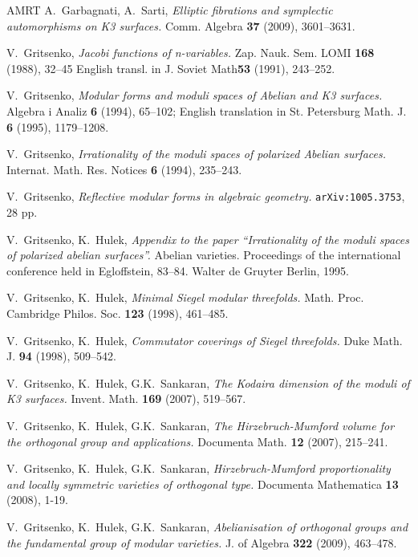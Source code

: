 \documentclass[a4paper,11pt]{article}
\begin{document}
\begin{thebibliography}{AMRT}
 A.~Garbagnati, A.~Sarti, {\it Elliptic fibrations and
  symplectic automorphisms on K3 surfaces.}  Comm. Algebra {\bf 37}
  (2009), 3601--3631.

 V.~Gritsenko, {\it Jacobi functions of n-variables.}
  Zap. Nauk. Sem. LOMI {\bf 168} (1988), 32--45 English transl. in
  J. Soviet Math\. {\bf 53} (1991), 243--252.

 V.~Gritsenko, {\it Modular forms and moduli spaces of
  Abelian and K3 surfaces.} Algebra i Analiz {\bf 6} (1994), 65--102;
  English translation in St. Petersburg Math. J. {\bf 6} (1995),
  1179--1208.

 V.~Gritsenko, {\it Irrationality of the moduli spaces
  of polarized Abelian surfaces.}  Internat. Math. Res. Notices {\bf
  6} (1994), 235--243.

 V.~Gritsenko, \emph{Reflective modular forms in
  algebraic geometry.}  {\tt arXiv:1005.3753}, 28 pp.

 V.~Gritsenko, K.~Hulek, {\it Appendix to the paper
  ``Irrationality of the moduli spaces of polarized abelian
  surfaces''.}  Abelian varieties. Proceedings of the international
  conference held in Egloffstein, 83--84. Walter de Gruyter Berlin,
  1995.

 V.~Gritsenko, K.~Hulek, {\it Minimal Siegel modular
  threefolds.}  Math. Proc. Cambridge Philos. Soc. {\bf 123} (1998),
  461--485.

 V.~Gritsenko, K.~Hulek, \emph{Commutator coverings
  of Siegel threefolds.}  Duke Math. J. {\bf 94} (1998), 509--542.

 V.~Gritsenko, K.~Hulek, G.K.~Sankaran, {\it The
  Kodaira dimension of the moduli of K3 surfaces.} Invent. Math.
  {\bf 169} (2007), 519--567.

 V.~Gritsenko, K.~Hulek, G.K.~Sankaran, {\it The
  Hirzebruch-Mum\-ford volume for the orthogonal group and
  applications.} Documenta Math. {\bf 12} (2007), 215--241.

 V.~Gritsenko, K.~Hulek, G.K.~Sankaran,
  \emph{Hirzebruch-Mumford proportionality and locally symmetric
    varieties of orthogonal type.} Documenta Mathematica {\bf 13}
  (2008), 1-19.

 V.~Gritsenko, K.~Hulek, G.K.~Sankaran,
  \emph{Abelianisation of orthogonal groups and the fundamental group
    of modular varieties.} J. of Algebra {\bf 322} (2009), 463--478.


\end{thebibliography}
\end{document}
